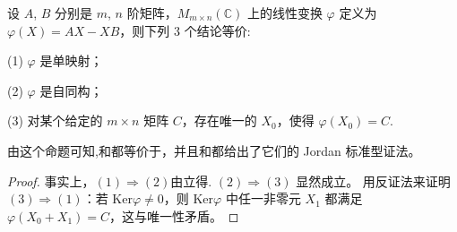 \documentclass[../../main.tex]{subfiles}
\begin{document}
\begin{proposition}\label{proposition:AX-XB线性映射相关等价条件}
设 $A$, $B$ 分别是 $m$, $n$ 阶矩阵，$M_{m\times n}(\mathbb{C})$ 上的线性变换 $\varphi$ 定义为 $\varphi(X) = AX - XB$，则下列 3 个结论等价:

(1) $\varphi$ 是单映射；

(2) $\varphi$ 是自同构；

(3) 对某个给定的 $m \times n$ 矩阵 $C$，存在唯一的 $X_0$，使得 $\varphi(X_0) = C$.
\end{proposition}
\begin{remark}
由这个命题可知,和都等价于，并且和都给出了它们的 Jordan 标准型证法。
\end{remark}
\begin{proof}
事实上，$(1) \Rightarrow (2)$由立得. 
$(2) \Rightarrow (3)$ 显然成立。
用反证法来证明 $(3) \Rightarrow (1)$：若 $\mathrm{Ker}\varphi \neq 0$，则 $\mathrm{Ker}\varphi$ 中任一非零元 $X_1$ 都满足 $\varphi(X_0 + X_1) = C$，这与唯一性矛盾。
\end{proof}
\end{document}
